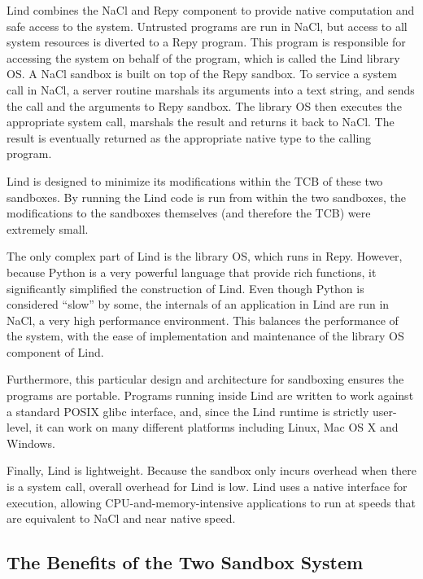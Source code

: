 Lind combines the NaCl and Repy component to provide native computation and 
safe access to the system. Untrusted programs are run in NaCl, 
but access to all system resources is diverted to a Repy program. 
This program is responsible for accessing the system on behalf of the program, 
which is called the Lind library OS. A NaCl sandbox is built on top of the Repy sandbox. 
To service a system call in NaCl, a server routine marshals its arguments into a text string, 
and sends the call and the arguments to Repy sandbox. 
The library OS then executes the appropriate system call, marshals the result and 
returns it back to NaCl. The result is eventually returned as the appropriate native type to the calling program. 

Lind is designed to minimize its modifications within the TCB of these two sandboxes. 
By running the Lind code is run from within the two sandboxes, 
the modifications to the sandboxes themselves (and therefore the TCB) were extremely small. 

The only complex part of Lind is the library OS, which runs in Repy. 
However, because Python is a very powerful language that provide rich functions, 
it significantly simplified the construction of Lind. Even though Python is considered ``slow'' by some, 
the internals of an application in Lind are run in NaCl, a very high performance environment. 
This balances the performance of the system, with the ease of implementation and maintenance 
of the library OS component of Lind. 

Furthermore, this particular design and architecture for sandboxing ensures the programs are portable. 
Programs running inside Lind are written to work against a standard POSIX glibc interface, 
and, since the Lind runtime is strictly user-level, it can work on many different platforms 
including Linux, Mac OS X and Windows.

Finally, Lind is lightweight. Because the sandbox only incurs overhead when there is a system call, 
overall overhead for Lind is low. Lind uses a native interface for execution, 
allowing CPU-and-memory-intensive applications to run at speeds that are equivalent to NaCl and near native speed. 

\subsection{The Benefits of the Two Sandbox System}

